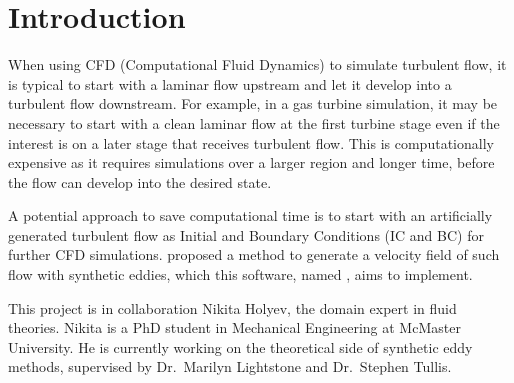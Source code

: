 \documentclass[12pt]{article}
\begin{document}





\section{Introduction}
When using CFD (Computational Fluid Dynamics) to simulate turbulent flow, it is typical to start with a laminar flow upstream and let it develop into a turbulent flow downstream. For example, in a gas turbine simulation, it may be necessary to start with a clean laminar flow at the first turbine stage even if the interest is on a later stage that receives turbulent flow. This is computationally expensive as it requires simulations over a larger region and longer time, before the flow can develop into the desired state. 

A potential approach to save computational time is to start with an artificially generated turbulent flow as Initial and Boundary Conditions (IC and BC) for further CFD simulations. \citet{PolettoEtAl2013} proposed a method to generate a velocity field of such flow with synthetic eddies, which this software, named \progname{}, aims to implement.

This project is in collaboration Nikita Holyev, the domain expert in fluid theories. Nikita is a PhD student in Mechanical Engineering at McMaster University. He is currently working on the theoretical side of synthetic eddy methods, supervised by Dr.~Marilyn Lightstone and Dr.~Stephen Tullis.
\end{document}
